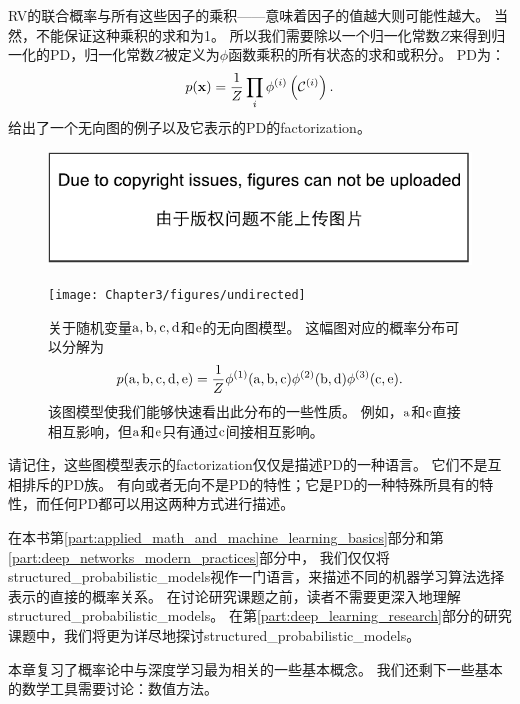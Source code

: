 \gls{RV}的联合概率与所有这些因子的乘积——意味着因子的值越大则可能性越大。
当然，不能保证这种乘积的求和为1。
所以我们需要除以一个归一化常数$Z$来得到归一化的\gls{PD}，归一化常数$Z$被定义为$\phi$函数乘积的所有状态的求和或积分。
\gls{PD}为：
\begin{equation}
p(\mathbf{x}) = \frac{1}{Z} \prod_i \phi^{(i)} \left (\mathcal{C}^{(i)} \right).
\end{equation}
给出了一个无向图的例子以及它表示的\gls{PD}的\gls{factorization}。
\begin{figure}[!htb]
\ifOpenSource
\centerline{\includegraphics{figure.pdf}}
\else
\centerline{\texttt{[image: Chapter3/figures/undirected]}}
\fi
\captionsetup{singlelinecheck=off}
\caption[.]{关于随机变量$\mathrm{a}, \mathrm{b}, \mathrm{c}, \mathrm{d}$和$\mathrm{e}$的无向图模型。
这幅图对应的概率分布可以分解为
\begin{equation}
p(\mathrm{a}, \mathrm{b}, \mathrm{c}, \mathrm{d}, \mathrm{e}) = \frac{1}{Z} \phi^{(1)} (\mathrm{a}, \mathrm{b}, \mathrm{c}) \phi^{(2)}(\mathrm{b}, \mathrm{d}) \phi^{(3)} (\mathrm{c}, \mathrm{e}).
\end{equation}
该图模型使我们能够快速看出此分布的一些性质。
例如，$\mathrm{a}$和$\mathrm{c}$直接相互影响，但$\mathrm{a}$和$\mathrm{e}$只有通过$\mathrm{c}$间接相互影响。}
\label{fig:chap3_undirected}
\end{figure}



请记住，这些图模型表示的\gls{factorization}仅仅是描述\gls{PD}的一种语言。
它们不是互相排斥的\gls{PD}族。
有向或者无向不是\gls{PD}的特性；它是\gls{PD}的一种特殊所具有的特性，而任何\gls{PD}都可以用这两种方式进行描述。

在本书第\ref{part:applied_math_and_machine_learning_basics}部分和第\ref{part:deep_networks_modern_practices}部分中， 我们仅仅将\gls{structured_probabilistic_models}视作一门语言，来描述不同的机器学习算法选择表示的直接的概率关系。
在讨论研究课题之前，读者不需要更深入地理解\gls{structured_probabilistic_models}。
在第\ref{part:deep_learning_research}部分的研究课题中，我们将更为详尽地探讨\gls{structured_probabilistic_models}。

本章复习了概率论中与深度学习最为相关的一些基本概念。
我们还剩下一些基本的数学工具需要讨论：数值方法。

